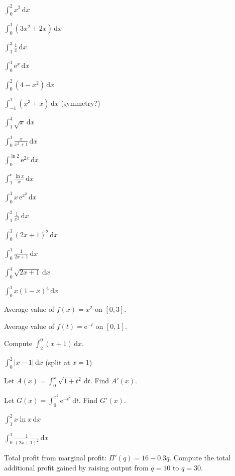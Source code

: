 \begin{problems}
  \item $\displaystyle\int_{0}^{2} x^{2}\,\mathrm{d}x$
  \item $\displaystyle\int_{0}^{1} (3x^{2}+2x)\,\mathrm{d}x$
  \item $\displaystyle\int_{1}^{3} \frac{1}{x}\,\mathrm{d}x$
  \item $\displaystyle\int_{0}^{1} \mathrm{e}^{x}\,\mathrm{d}x$
  \item $\displaystyle\int_{0}^{2} (4-x^{2})\,\mathrm{d}x$
  \item $\displaystyle\int_{-1}^{1} (x^{3}+x)\,\mathrm{d}x$ \quad (symmetry?)
  \item $\displaystyle\int_{1}^{4} \sqrt{x}\,\mathrm{d}x$
  \item $\displaystyle\int_{0}^{1} \frac{x}{x^{2}+1}\,\mathrm{d}x$
  \item $\displaystyle\int_{0}^{\ln 2} \mathrm{e}^{2x}\,\mathrm{d}x$
  \item $\displaystyle\int_{1}^{\mathrm{e}} \frac{\ln x}{x}\,\mathrm{d}x$
  \item $\displaystyle\int_{0}^{1} x\,\mathrm{e}^{x^{2}}\,\mathrm{d}x$
  \item $\displaystyle\int_{1}^{2} \frac{1}{x^{2}}\,\mathrm{d}x$
  \item $\displaystyle\int_{0}^{3} (2x+1)^{2}\,\mathrm{d}x$
  \item $\displaystyle\int_{0}^{1} \frac{1}{2x+1}\,\mathrm{d}x$
  \item $\displaystyle\int_{0}^{4} \sqrt{2x+1}\,\mathrm{d}x$
  \item $\displaystyle\int_{0}^{1} x(1-x)^{4}\,\mathrm{d}x$
  \item Average value of $f(x)=x^{2}$ on $[0,3]$.
  \item Average value of $f(t)=\mathrm{e}^{-t}$ on $[0,1]$.
  \item Compute $\displaystyle\int_{2}^{0} (x+1)\,\mathrm{d}x$.
  \item $\displaystyle\int_{0}^{2} |x-1|\,\mathrm{d}x$ \quad (split at $x=1$)
  \item Let $A(x)=\displaystyle\int_{0}^{x} \sqrt{1+t^{2}}\,\mathrm{d}t$.
        Find $A'(x)$.
  \item Let $G(x)=\displaystyle\int_{0}^{x^{2}} \mathrm{e}^{-t^{2}}\,\mathrm{d}t$.
        Find $G'(x)$.
  \item $\displaystyle\int_{1}^{2} x\ln x\,\mathrm{d}x$
  \item $\displaystyle\int_{0}^{1} \frac{1}{(2x+1)^{2}}\,\mathrm{d}x$
  \item Total profit from marginal profit: $\Pi'(q)=16-0.3q$. Compute the
        total additional profit gained by raising output from $q=10$ to
        $q=30$.
\end{problems}

